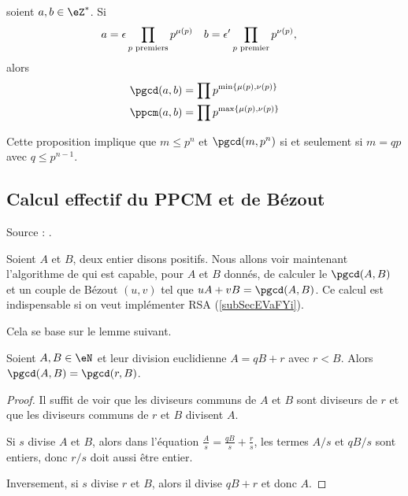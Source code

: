 \begin{proposition}
    soient \( a,b\in\eZ^*\). Si
    \begin{equation}
        \begin{aligned}[]
            a&=\epsilon\prod_{\text{\( p\) premiers}}p^{\mu(p)}&b&=\epsilon'\prod_{\text{\( p\) premier}}p^{\nu(p)},
        \end{aligned}
    \end{equation}
    alors
    \begin{subequations}
        \begin{align}
            \pgcd(a,b)&=\prod p^{\min\{ \mu(p),\nu(p) \}}\\
            \ppcm(a,b)&=\prod p^{\max\{ \mu(p),\nu(p) \}}
        \end{align}
    \end{subequations}    
\end{proposition}

Cette proposition implique que \( m\leq p^n\) et \( \pgcd(m,p^n)\) si et seulement si \( m=qp\) avec \( q\leq p^{n-1}\).

\subsection{Calcul effectif du PPCM et de Bézout}
\label{subSecIpmnhO}

Source : \cite{BezoutCos}.

Soient \( A\) et \( B\), deux entier disons positifs. Nous allons voir maintenant l'algorithme de  qui est capable, pour \( A\) et \( B\) donnés, de calculer le \( \pgcd(A,B)\) et un couple de Bézout \( (u,v)\) tel que \( uA+vB=\pgcd(A,B)\). Ce calcul est indispensable si on veut implémenter RSA (\ref{subSecEVaFYi}).

Cela se base sur le lemme suivant.

\begin{lemma}       \label{LemiVqita}
    Soient \( A,B\in \eN\) et leur division euclidienne \( A=qB+r\) avec \( r<B\). Alors \( \pgcd(A,B)=\pgcd(r,B)\).
\end{lemma}

\begin{proof}
    Il suffit de voir que les diviseurs communs de \( A\) et \( B\) sont diviseurs de \( r\) et que les diviseurs communs de \( r\) et \( B\) divisent \( A\).

    Si \( s\) divise \( A\) et \( B\), alors dans l'équation \( \frac{ A }{ s }=\frac{ qB }{ s }+\frac{ r }{ s }\), les termes \( A/s\) et \( qB/s\) sont entiers, donc \( r/s\) doit aussi être entier.

    Inversement, si \( s\) divise \( r\) et \( B\), alors il divise \( qB+r\) et donc \( A\).
\end{proof}

